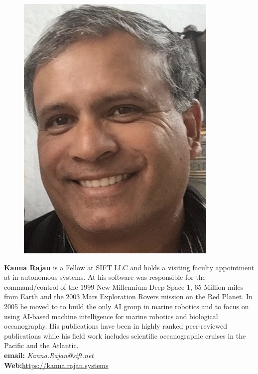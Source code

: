 \parbox{6.3in}{
\begin{figure} %
    \vspace{-\intextsep}
    \hspace*{-.35\columnsep}\includegraphics[scale=0.4]{fig/KRajan.jpg}
\end{figure}
\textbf{Kanna Rajan} is a Fellow at SIFT LLC and holds a visiting
faculty appointment at \univ in autonomous systems. At \inst his
software was responsible for the command/control of the 1999 New
Millennium Deep Space 1, 65 Million miles from Earth and the 2003 Mars
Exploration Rovers mission on the Red Planet. In 2005 he moved to \mba
to build the only AI group in marine robotics and to focus on using
AI-based machine intelligence for marine robotics and biological
oceanography. His publications have been in highly ranked
peer-reviewed publications while his field work includes scientific
oceanographic cruises in the Pacific and the Atlantic.
\\
\textbf{email: }\emph{Kanna.Rajan@sift.net}\\
\textbf{Web:}\url{https://kanna.rajan.systems} }

